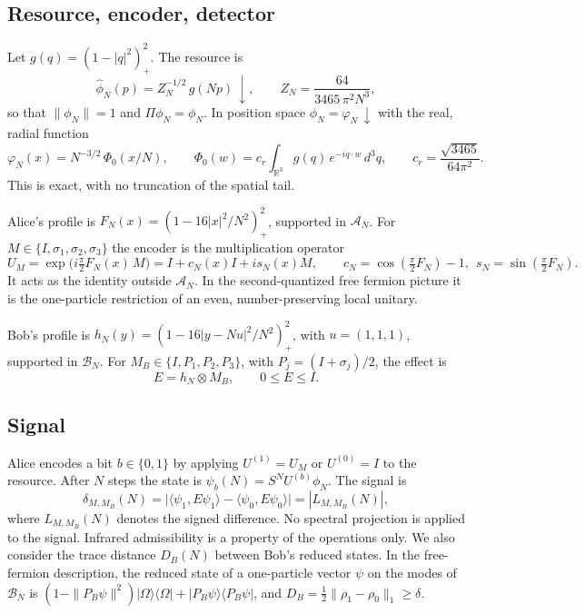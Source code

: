 \documentclass[11pt]{amsart}
\theoremstyle{definition}
\theoremstyle{remark}
\newcommand{\R}{\mathbb{R}}
\newcommand{\cA}{\mathcal{A}}
\newcommand{\cB}{\mathcal{B}}
\newcommand{\dn}{{\downarrow}}
\begin{document}
\subsection{Resource, encoder, detector}
Let $g(q)=(1-|q|^2)_+^2$.  The resource is
\[
\hat\phi_N(p)=Z_N^{-1/2}\,g(Np)\,\dn,
\qquad Z_N=\frac{64}{3465\,\pi^2N^3},
\]
so that $\|\phi_N\|=1$ and $\Pi\phi_N=\phi_N$.  In position space
$\phi_N=\varphi_N\,\dn$ with the real, radial function
\begin{equation}\label{eq:resource}
\varphi_N(x)=N^{-3/2}\,\Phi_0(x/N),\qquad
\Phi_0(w)=c_r\int_{\R^3}g(q)\,e^{-iq\cdot w}\,d^3q,\qquad c_r=\frac{\sqrt{3465}}{64\pi^2}.
\end{equation}
This is exact, with no truncation of the spatial tail.

Alice's profile is $F_N(x)=(1-16|x|^2/N^2)_+^2$, supported in $\cA_N$.  For
$M\in\{I,\sigma_1,\sigma_2,\sigma_3\}$ the encoder is the multiplication
operator
\[
U_M=\exp\bigl(i\tfrac\pi2F_N(x)\,M\bigr)=I+c_N(x)I+is_N(x)M,
\qquad c_N=\cos(\tfrac\pi2F_N)-1,\ \ s_N=\sin(\tfrac\pi2F_N).
\]
It acts as the identity outside $\cA_N$.  In the second-quantized free
fermion picture it is the one-particle restriction of an even,
number-preserving local unitary.

Bob's profile is $h_N(y)=(1-16|y-Nu|^2/N^2)_+^2$, with $u=(1,1,1)$,
supported in $\cB_N$.
For $M_B\in\{I,P_1,P_2,P_3\}$, with $P_j=(I+\sigma_j)/2$, the effect is
\[
E=h_N\otimes M_B,\qquad 0\le E\le I .
\]

\subsection{Signal}
Alice encodes a bit $b\in\{0,1\}$ by applying $U^{(1)}=U_M$ or $U^{(0)}=I$ to
the resource.  After $N$ steps the state is
$\psi_b(N)=S^NU^{(b)}\phi_N$.  The signal is
\begin{equation}\label{eq:signal}
\delta_{M,M_B}(N)=\bigl|\langle\psi_1,E\psi_1\rangle-\langle\psi_0,E\psi_0\rangle\bigr|=|L_{M,M_B}(N)|,
\end{equation}
where $L_{M,M_B}(N)$ denotes the signed difference.  No spectral projection is
applied to the signal.  Infrared admissibility is a property of the
operations only.  We also consider the trace distance $D_B(N)$ between Bob's
reduced states.  In the free-fermion description, the reduced state of a
one-particle vector $\psi$ on the modes of $\cB_N$ is
$(1-\|P_B\psi\|^2)|\Omega\rangle\langle\Omega|+|P_B\psi\rangle\langle P_B\psi|$,
and $D_B=\frac12\|\rho_1-\rho_0\|_1\ge\delta$.
\end{document}
